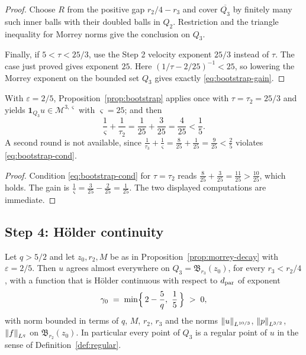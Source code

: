 \documentclass[11pt,reqno]{amsart}
\begin{document}
\begin{proof}
Choose $R$ from the positive gap $r_2/4-r_3$ and cover
$\overline{Q_3}$ by finitely many such inner balls with their doubled
balls in $Q_2$. Restriction and the triangle inequality for Morrey norms
give the conclusion on $Q_3$.

Finally, if $5<\tau<25/3$, use the Step 2 velocity exponent $25/3$
instead of $\tau$. The case just proved gives exponent $25$.
Here $(1/\tau-2/25)^{-1}<25$, so lowering the Morrey exponent on
the bounded set $Q_3$ gives exactly \eqref{eq:bootstrap-gain}.
\end{proof}

\begin{corollary}\label{cor:one-round}
With $\varepsilon=2/5$, Proposition~\ref{prop:bootstrap} applies once with
$\tau=\tau_{2}=25/3$ and yields $\mathbf{1}_{Q_{3}}u\in\mathcal{M}^{3,\varsigma}$
with $\varsigma=25$; and then
\begin{equation}\label{eq:one-round}
  \frac1\varsigma+\frac1{\tau_{2}}=\frac1{25}+\frac3{25}=\frac4{25}<\frac15 .
\end{equation}
A second round is not available, since
$\tfrac1{\tau_{3}}+\tfrac1\varsigma=\tfrac8{25}+\tfrac1{25}=\tfrac9{25}<\tfrac25$
violates \eqref{eq:bootstrap-cond}.
\end{corollary}

\begin{proof}
Condition \eqref{eq:bootstrap-cond} for $\tau=\tau_{2}$ reads
$\tfrac8{25}+\tfrac3{25}=\tfrac{11}{25}>\tfrac{10}{25}$, which holds. The gain
is $\tfrac1\varsigma=\tfrac3{25}-\tfrac2{25}=\tfrac1{25}$. The two displayed
computations are immediate.
\end{proof}

\subsection{Step 4: H\"older continuity}\label{ss:step4}

\begin{theorem}[Endgame]\label{thm:endgame}
Let $q>5/2$ and let $z_{0},r_{2},M$ be as in
Proposition~\ref{prop:morrey-decay} with $\varepsilon=2/5$. Then $u$ agrees
almost everywhere on $Q_{3}=\mathfrak{B}_{r_{3}}(z_{0})$, for every
$r_{3}<r_{2}/4$, with a function that is H\"older continuous with respect to
$d_{\mathrm{par}}$ of exponent
\begin{equation}\label{eq:gamma-value}
  \gamma_{0}\;=\;\min\Bigl\{\,2-\frac5q,\ \frac15\,\Bigr\}\;>\;0,
\end{equation}
with norm bounded in terms of $q$, $M$, $r_{2}$, $r_{3}$ and the norms
$\left\lVert u \right\rVert_{L^{10/3}}$, $\left\lVert p \right\rVert_{L^{3/2}}$, $\left\lVert f \right\rVert_{L^{q}}$ on
$\mathfrak{B}_{r_{2}}(z_{0})$. In particular every point of $Q_{3}$ is a regular
point of $u$ in the sense of Definition~\ref{def:regular}.
\end{theorem}
\end{document}
